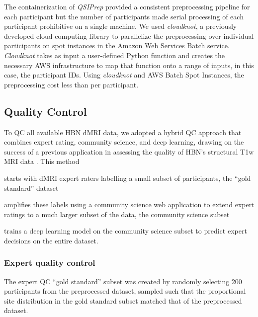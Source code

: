 \documentclass[fleqn,10pt,inline]{wlscirep}
\begin{document}
The containerization of \emph{QSIPrep} provided a consistent preprocessing
pipeline for each participant but the number of participants made serial processing of
each participant prohibitive on a single machine. We used \emph{cloudknot}, a
previously developed cloud-computing library \cite{cloudknot} to
parallelize the preprocessing over individual participants on spot instances in the
Amazon Web Services Batch service. \emph{Cloudknot} takes as input a
user-defined Python function and creates the necessary AWS infrastructure to map
that function onto a range of inputs, in this case, the participant IDs.
Using \emph{cloudknot} and AWS Batch Spot Instances, the preprocessing cost less than  per participant.

\subsection*{Quality Control}

To QC all available HBN dMRI data, we adopted a hybrid QC approach that
combines expert rating, community science, and deep learning, drawing on the
success of a previous application in assessing the quality of HBN's structural
T1w MRI data \cite{keshavan2019-er}. This method
\begin{enumerate*}[%
    label=(\roman*),%
    before={{ }},%
    itemjoin={{; }},%
    itemjoin*={{ and }}]
    \item starts with dMRI expert raters labelling a small subset of participants,
    the ``gold standard'' dataset
    \item amplifies these labels using a community science web application to
    extend expert ratings to a much larger subset of the data, the community
    science subset
    \item trains a deep learning model on the community science subset to
    predict expert decisions on the entire dataset.
\end{enumerate*}

\subsubsection*{Expert quality control}

The expert QC ``gold standard'' subset was created by randomly selecting 200
participants from the preprocessed dataset, sampled such that the proportional site
distribution in the gold standard subset matched that of the preprocessed
dataset.
\end{document}
